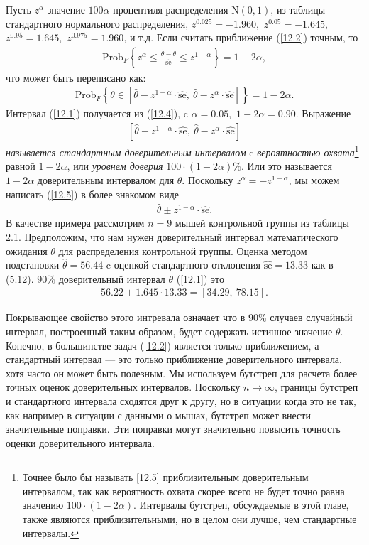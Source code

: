 Пусть $z^{\alpha}$ значение $100\alpha$ процентиля распределения $\mathrm{N}(0,1)$, из таблицы стандартного нормального распределения, $z^{0.025} = -1.960,$  $z^{0.05} = -1.645,$ $z^{0.95} = 1.645,$ $z^{0.975} = 1.960$, и т.д.
Если считать приближение (\ref{12.2}) точным, то
\begin{gather}\label{12.3}
\text{Prob}_{F} \left \{ z^{\alpha} \le \frac{\widehat{\theta} - \theta}{\widehat{\text{se}}} \le z^{1 - \alpha }\right\} = 1 - 2 \alpha,
\end{gather}
что может быть переписано как:
\begin{gather}\label{12.4}
\text{Prob}_{F}\left\{ \theta \in [ \widehat{\theta} - z^{1 - \alpha } \cdot \widehat{\text{se}}, \ \widehat{\theta} - z^{\alpha } \cdot \widehat{\text{se}} ] \right\} = 1 - 2 \alpha.
\end{gather}
Интервал (\ref{12.1}) получается из (\ref{12.4}), c $\alpha = 0.05,$ $1 - 2 \alpha = 0.90.$ Выражение
\begin{gather}\label{12.5}
[ \widehat{\theta} - z^{1 - \alpha } \cdot \widehat{\text{se}},\ \widehat{\theta} - z^{\alpha} \cdot \widehat{\text{se}}]
\end{gather}
\textit{называется стандартным доверительным интервалом} c \textit{вероятностью охвата}\footnote{Точнее было бы называть \ref{12.5} \underline{приблизительным} доверительным интервалом, так как вероятность охвата скорее всего не будет точно равна значению $100 \cdot(1 - 2 \alpha)$. Интервалы бутстреп, обсуждаемые в этой главе, также являются приблизительными, но в целом они лучше, чем стандартные интервалы.} равной $1 - 2 \alpha$, или \textit{уровнем доверия} $100 \cdot(1 - 2 \alpha) \%$. Или это называется $1 - 2 \alpha$ доверительным интервалом для $\theta$. Поскольку $ z^{\alpha } = -z^{1 - \alpha}$, мы можем написать (\ref{12.5}) в более знакомом виде
\begin{gather}\label{12.6}
\widehat{\theta} \pm z^{1 - \alpha} \cdot \widehat{\text{se}}.
\end{gather}
В качестве примера рассмотрим $n = 9$ мышей контрольной группы из таблицы 2.1. Предположим, что нам нужен доверительный интервал математического ожидания $\theta$ для распределения контрольной группы. Оценка методом подстановки $\widehat{\theta} = 56.44$ c оценкой стандартного отклонения $\widehat{\text{se}} = 13.33 $ как в (5.12). $90 \%$ доверительный интервал $\theta$ (\ref{12.1}) это
\begin{gather}\label{12.7}
56.22 \pm 1.645\cdot 13.33 = [34.29,\ 78.15].
\end{gather}

Покрывающее свойство этого интревала означает что в $90\% $ случаев случайный интервал, построенный таким образом, будет содержать истинное значение $\theta.$ Конечно, в большинстве задач (\ref{12.2}) является только приближением, а стандартный интервал --- это только приближение доверительного интервала, хотя часто он может быть полезным. Мы используем бутстреп для расчета более точных оценок доверительных интервалов. Поскольку $n \rightarrow \infty$, границы бутстреп и стандартного интервала сходятся друг к другу, но в ситуации когда это не так, как например в ситуации с данными о мышах, бутстреп может внести значительные поправки. Эти поправки могут значительно повысить точность оценки доверительного интервала. 